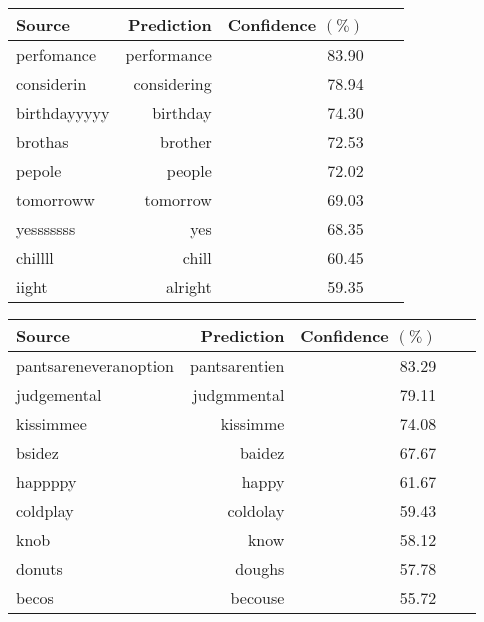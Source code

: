 \documentclass[letterpaper]{article} \usepackage{aaai19}  \usepackage{times}  \usepackage{helvet} \usepackage{courier}  \usepackage[hyphens]{url}  \usepackage{graphicx} \urlstyle{rm} \def\UrlFont{\rm}  \usepackage{graphicx}  \frenchspacing  \setlength{\pdfpagewidth}{8.5in}  \setlength{\pdfpageheight}{11in}
\begin{document}
\begin{table*}[h]
\centering
\begin{minipage}{0.43\textwidth}
\begin{tabular}{lrrrr}
    \textbf{Source} & \textbf{Prediction} & \textbf{Confidence $(\%)$} \\
    \hline
   perfomance	& {\color{blue} performance}& 83.90 \\
   considerin & {\color{blue} considering} & 78.94 \\
   birthdayyyyy & {\color{blue} birthday} & 74.30 \\
   brothas & {\color{blue} brother} & 72.53 \\
   pepole & {\color{blue} people} & 72.02 \\
   tomorroww & {\color{blue} tomorrow} & 69.03 \\
   yesssssss & {\color{blue} yes} & 68.35 \\
   chillll & {\color{blue} chill} & 60.45 \\
   iight & {\color{blue} alright} & 59.35  \\
    \end{tabular}
    \end{minipage}
\begin{minipage}{0.43\textwidth}
  \begin{tabular}{lrrrr}
        \textbf{Source} & \textbf{Prediction} & \textbf{Confidence $(\%)$} \\
    \hline
   pantsareneveranoption	& {\color{red} pantsarentien}& 83.29 \\
   judgemental	& {\color{red} judgmmental}& 79.11 \\
   kissimmee	& {\color{red} kissimme}& 74.08 \\
   bsidez	& {\color{red} baidez}& 67.67 \\
   happppy	& {\color{red} happy}& 61.67 \\
   coldplay	& {\color{red} coldolay}& 59.43 \\
   knob	& {\color{red} know} & 58.12 \\
   donuts	& {\color{red} doughs} & 57.78 \\
   becos	& {\color{red} becouse}& 55.72 \\
   \end{tabular}
\end{minipage}
\caption{OOV words that our secondary character model has normalized correctly (blue) or incorrectly (red)}
  \label{table:confidence}
\end{table*}
\end{document}

